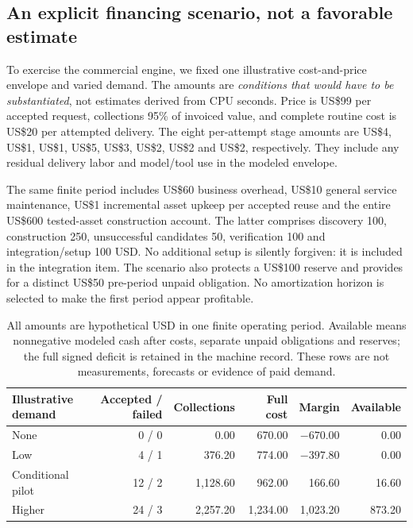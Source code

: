 \documentclass[11pt,letterpaper]{article}
\newcommand{\usd}[1]{US\$#1}
\begin{document}
\subsection{An explicit financing scenario, not a favorable estimate}
To exercise the commercial engine, we fixed one illustrative cost-and-price envelope and varied demand. The amounts are \emph{conditions that would have to be substantiated}, not estimates derived from CPU seconds. Price is \usd{99} per accepted request, collections 95\% of invoiced value, and complete routine cost is \usd{20} per attempted delivery. The eight per-attempt stage amounts are \usd{4}, \usd{1}, \usd{1}, \usd{5}, \usd{3}, \usd{2}, \usd{2} and \usd{2}, respectively. They include any residual delivery labor and model/tool use in the modeled envelope.

The same finite period includes \usd{60} business overhead, \usd{10} general service maintenance, \usd{1} incremental asset upkeep per accepted reuse and the entire \usd{600} tested-asset construction account. The latter comprises discovery 100, construction 250, unsuccessful candidates 50, verification 100 and integration/setup 100 USD. No additional setup is silently forgiven: it is included in the integration item. The scenario also protects a \usd{100} reserve and provides for a distinct \usd{50} pre-period unpaid obligation. No amortization horizon is selected to make the first period appear profitable.

\begin{table}[ht]
\centering\small
\begin{tabularx}{\linewidth}{@{}Yrrrrr@{}}
\toprule
Illustrative demand & Accepted / failed & Collections & Full cost & Margin & Available\\\midrule
None & 0 / 0 & 0.00 & 670.00 & $-670.00$ & 0.00\\
Low & 4 / 1 & 376.20 & 774.00 & $-397.80$ & 0.00\\
Conditional pilot & 12 / 2 & 1,128.60 & 962.00 & 166.60 & 16.60\\
Higher & 24 / 3 & 2,257.20 & 1,234.00 & 1,023.20 & 873.20\\
\bottomrule
\end{tabularx}
\caption{All amounts are hypothetical USD in one finite operating period. Available means nonnegative modeled cash after costs, separate unpaid obligations and reserves; the full signed deficit is retained in the machine record. These rows are not measurements, forecasts or evidence of paid demand.}
\end{table}
\end{document}
